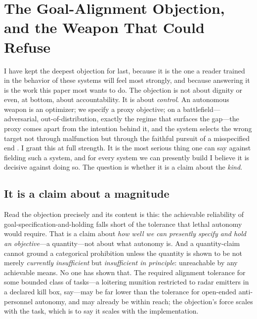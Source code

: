 \documentclass[11pt]{article}
\begin{document}
\section{The Goal-Alignment Objection, and the Weapon That Could Refuse}
\label{sec:alignment}

I have kept the deepest objection for last, because it is the one a reader trained in the behavior of these systems will feel most strongly, and because answering it is the work this paper most wants to do. The objection is not about dignity or even, at bottom, about accountability. It is about \emph{control}. An autonomous weapon is an optimizer; we specify a proxy objective; on a battlefield---adversarial, out-of-distribution, exactly the regime that surfaces the gap---the proxy comes apart from the intention behind it, and the system selects the wrong target not through malfunction but through the faithful pursuit of a misspecified end \citep{amodei2016, hubinger2019, langosco2022, hubinger2024}. I grant this at full strength. It is the most serious thing one can say against fielding such a system, and for every system we can presently build I believe it is decisive against doing so. The question is whether it is a claim about the \emph{kind}.

\subsection{It is a claim about a magnitude}

Read the objection precisely and its content is this: the achievable reliability of goal-specification-and-holding falls short of the tolerance that lethal autonomy would require. That is a claim about \emph{how well we can presently specify and hold an objective}---a quantity---not about what autonomy is. And a quantity-claim cannot ground a categorical prohibition unless the quantity is shown to be not merely \emph{currently insufficient} but \emph{insufficient in principle}: unreachable by any achievable means. No one has shown that. The required alignment tolerance for some bounded class of tasks---a loitering munition restricted to radar emitters in a declared kill box, say---may be far lower than the tolerance for open-ended anti-personnel autonomy, and may already be within reach; the objection's force scales with the task, which is to say it scales with the implementation.
\end{document}
